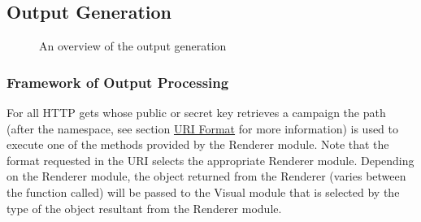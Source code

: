 \documentclass[10pt,a4paper,english]{article}
\begin{document}

\hypertarget{output-generation}{}
\subsection*{Output Generation}
\label{output-generation}
\begin{figure}[htbp]
\centering

\caption{An overview of the output generation}\end{figure}



\hypertarget{framework-of-output-processing}{}
\subsubsection*{Framework of Output Processing}
\label{framework-of-output-processing}

For all HTTP gets whose public or secret key retrieves a campaign the path (after the namespace, see section \href{\#uri-format}{URI Format} for more information) is used to execute one of the methods provided by the Renderer module. Note that the format requested in the URI selects the appropriate Renderer module. Depending on the Renderer module, the object returned from the Renderer (varies between the function called) will be passed to the Visual module that is selected by the type of the object resultant from the Renderer module.
\end{document}
